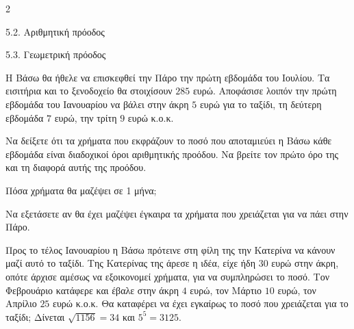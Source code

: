 \begin{ylh}{2}
    \item 5.2. Αριθμητική πρόοδος
    \item 5.3. Γεωμετρική πρόοδος
\end{ylh}
Η Βάσω θα ήθελε να επισκεφθεί την Πάρο την πρώτη εβδομάδα του Ιουλίου. Τα εισιτήρια και το ξενοδοχείο θα στοιχίσουν $285$ ευρώ. Αποφάσισε λοιπόν την πρώτη εβδομάδα του Ιανουαρίου να βάλει στην άκρη $5$ ευρώ για το ταξίδι, τη δεύτερη εβδομάδα $7$ ευρώ, την τρίτη $9$ ευρώ κ.ο.κ.

\begin{alist}
\item Να δείξετε ότι τα χρήματα που εκφράζουν το ποσό που αποταμιεύει η Βάσω κάθε εβδομάδα είναι διαδοχικοί όροι αριθμητικής προόδου. Να βρείτε τον πρώτο όρο της και τη διαφορά αυτής της προόδου.
\item

\begin{rlist}
\item Πόσα χρήματα θα μαζέψει σε 1 μήνα;
\item Να εξετάσετε αν θα έχει μαζέψει έγκαιρα τα χρήματα που χρειάζεται για να πάει στην Πάρο.
\end{rlist}
\item Προς το τέλος Ιανουαρίου η Βάσω πρότεινε στη φίλη της την Κατερίνα να κάνουν μαζί αυτό το ταξίδι. Της Κατερίνας της άρεσε η ιδέα, είχε ήδη $30$ ευρώ στην άκρη, οπότε άρχισε αμέσως να εξοικονομεί χρήματα, για να συμπληρώσει το ποσό. Τον Φεβρουάριο κατάφερε και έβαλε στην άκρη $4$ ευρώ, τον Μάρτιο $10$ ευρώ, τον Απρίλιο $25$ ευρώ κ.ο.κ. Θα καταφέρει να έχει εγκαίρως το ποσό που χρειάζεται για το ταξίδι;
Δίνεται $\sqrt{1156} = 34$ και $5^{5} = 3125$.
\end{alist}

